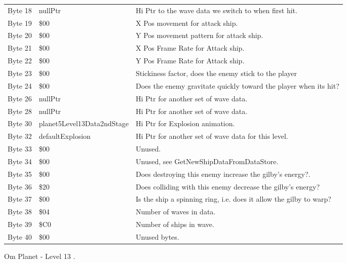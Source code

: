\begin{figure}[H]
{\begin{adjustbox}{width=12cm}
\begin{tabular}{lll}
 Byte 18 & nullPtr                    & Hi Ptr to the wave data we switch to when first hit.               \\
 Byte 19 & \$00                        & X Pos movement for attack ship.                                    \\
 Byte 20 & \$00                        & Y Pos movement pattern for attack ship.                            \\
 Byte 21 & \$00                        & X Pos Frame Rate for Attack ship.                                  \\
 Byte 22 & \$00                        & Y Pos Frame Rate for Attack ship.                                  \\
 Byte 23 & \$00                        & Stickiness factor, does the enemy stick to the player              \\
 Byte 24 & \$00                        & Does the enemy gravitate quickly toward the player when its hit?   \\
 Byte 26 & nullPtr                    & Hi Ptr for another set of wave data.                               \\
 Byte 28 & nullPtr                    & Hi Ptr for another set of wave data.                               \\
 Byte 30 & planet5Level13Data2ndStage & Hi Ptr for Explosion animation.                                    \\
 Byte 32 & defaultExplosion           & Hi Ptr for another set of wave data for this level.                \\
 Byte 33 & \$00                        & Unused.                                                            \\
 Byte 34 & \$00                        & Unused, see GetNewShipDataFromDataStore.                           \\
 Byte 35 & \$00                        & Does destroying this enemy increase the gilby's energy?.           \\
 Byte 36 & \$20                        & Does colliding with this enemy decrease the gilby's energy?        \\
 Byte 37 & \$00                        & Is the ship a spinning ring, i.e. does it allow the gilby to warp? \\
 Byte 38 & \$04                        & Number of waves in data.                                           \\
 Byte 39 & \$C0                        & Number of ships in wave.                                           \\
 Byte 40 & \$00                        & Unused bytes.                                                      \\
\bottomrule
\end{tabular}

  \end{adjustbox}

  }\caption*{Om Planet - Level 13
.}
\end{figure}

